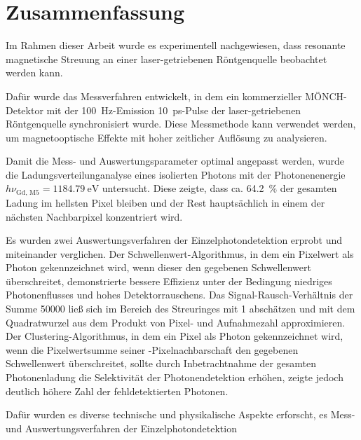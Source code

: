 \chapter{Zusammenfassung}
Im Rahmen dieser Arbeit wurde es experimentell nachgewiesen, dass resonante magnetische Streuung an einer laser-getriebenen Röntgenquelle beobachtet werden kann.
\begin{figure}[H]
    \centering
    
    \label{fig:summary_ring_no_ring}
\end{figure}
\noindent
Dafür wurde das Messverfahren entwickelt, in dem ein kommerzieller MÖNCH-Detektor mit der \SI{100}{\hertz}-Emission \SI{10}{\pico\second}-Pulse der laser-getriebenen Röntgenquelle synchronisiert wurde. Diese Messmethode kann verwendet werden, um magnetooptische Effekte mit hoher zeitlicher Auflösung zu analysieren. 

\noindent
Damit die Mess- und Auswertungsparameter optimal angepasst werden, wurde die Ladungsverteilunganalyse eines isolierten Photons mit der Photonenenergie $h\nu_\text{Gd, M5} = \SI{1184,79}{\eV}$ untersucht. Diese zeigte, dass ca. \SI{64,2}{\percent} der gesamten Ladung im hellsten Pixel bleiben und der Rest hauptsächlich in einem der nächsten Nachbarpixel konzentriert wird.

\noindent
Es wurden zwei Auswertungsverfahren der Einzelphotondetektion erprobt und miteinander verglichen. Der Schwellenwert-Algorithmus, in dem ein Pixelwert als Photon gekennzeichnet wird, wenn dieser den gegebenen Schwellenwert überschreitet, demonstrierte bessere Effizienz unter der Bedingung niedriges Photonenflusses und hohes Detektorrauschens. Das Signal-Rausch-Verhältnis der Summe \SI{50000}{\captures} ließ sich im Bereich des Streuringes mit 1 abschätzen und mit dem Quadratwurzel aus dem Produkt von Pixel- und Aufnahmezahl approximieren. Der Clustering-Algorithmus, in dem ein Pixel als Photon gekennzeichnet wird, wenn die Pixelwertsumme seiner -Pixelnachbarschaft den gegebenen Schwellenwert überschreitet, sollte durch Inbetrachtnahme der gesamten Photonenladung die Selektivität der Photonendetektion erhöhen, zeigte jedoch deutlich höhere Zahl der fehldetektierten Photonen.

Dafür wurden es diverse technische und physikalische Aspekte erforscht, 
es Mess- und Auswertungsverfahren der Einzelphotondetektion 

